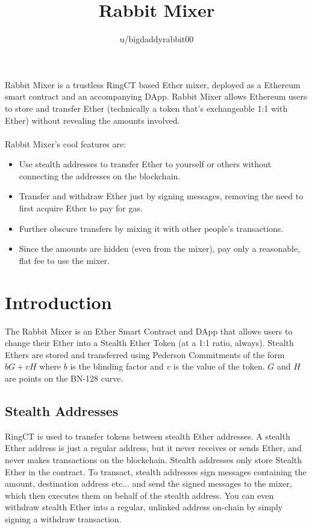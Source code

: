 \documentclass{article}
\title{Rabbit Mixer}
\author{u/bigdaddyrabbit00}
\begin{document}
\maketitle
Rabbit Mixer is a trustless RingCT based Ether mixer, deployed as a Ethereum smart contract and an accompanying DApp. Rabbit Mixer allows Ethereum users to store and transfer Ether (technically a token that's exchangeable 1:1 with Ether) without revealing the amounts involved. 

\paragraph{}
Rabbit Mixer's cool features are:
\begin{itemize}
\item Use stealth addresses to transfer Ether to yourself or others without connecting the addresses on the blockchain. 
\item Transfer and withdraw Ether just by signing messages, removing the need to first acquire Ether to pay for gas. 
\item Further obscure transfers by mixing it with other people's transactions.
\item Since the amounts are hidden (even from the mixer), pay only a reasonable, flat fee to use the mixer.
\end{itemize}



\newpage
{}
\section{Introduction}
The Rabbit Mixer is an Ether Smart Contract and DApp that allows users to change their Ether into a Stealth Ether Token (at a 1:1 ratio, always). Stealth Ethers are stored and transferred using Pederson Commitments of the form $bG + vH$ where $b$ is the blinding factor and $v$ is the value of the token. $G$ and $H$ are points on the BN-128 curve. 

\subsection{Stealth Addresses}
RingCT is used to transfer tokens between stealth Ether addresses. A stealth Ether address is just a regular address, but it never receives or sends Ether, and never makes transactions on the blockchain. Stealth addresses only store Stealth Ether in the contract. To transact, stealth addresses sign messages containing the amount, destination address etc... and send the signed messages to the mixer, which then executes them on behalf of the stealth address.  You can even withdraw stealth Ether into a regular, unlinked address on-chain by simply signing a withdraw transaction. 
\end{document}
